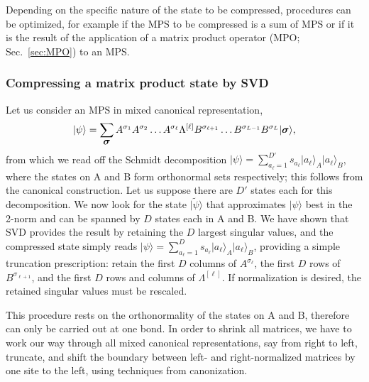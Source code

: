 \documentclass[a4paper,10pt,oneside,onecolumn,1p,times]{elsarticle}
\newcommand{\ket}[1]{\mbox{$| #1  \rangle$}}
\newcommand{\fat}[1]{\mbox{\boldmath$#1$\unboldmath}}	%
\begin{document}
Depending on the specific nature of the state to be compressed, procedures can be optimized, for example if the MPS to be compressed is a sum of MPS or if it is the result of the application of a matrix product operator (MPO; Sec.\ \ref{sec:MPO}) to an MPS.

\subsubsection{Compressing a matrix product state by SVD}
Let us consider an MPS in mixed canonical representation,
\begin{equation}
\ket{\psi} = \sum_{\fat{\sigma}} A^{\sigma_1} A^{\sigma_2} \ldots A^{\sigma_{\ell}} \Lambda^{[\ell]} B^{\sigma_{\ell+1}} \ldots B^{\sigma_{L-1}} B^{\sigma_L}  \ket{\fat{\sigma}} ,
\label{eq:compressionstart}
\end{equation}
from which we read off the Schmidt decomposition $\ket{\psi} = \sum_{a_\ell=1}^{D'} s_{a_\ell} \ket{a_\ell}_A \ket{a_\ell}_B$, where the states on A and B form orthonormal sets respectively; this follows from the canonical construction. Let us suppose there are $D'$ states each for this decomposition. We now look for the state $\ket{\tilde{\psi}}$ that approximates $\ket{\psi}$ best in the 2-norm and can be spanned by $D$ states each in A and B. We have shown that SVD provides the result by retaining the $D$ largest singular values, and the compressed state simply reads $\ket{\psi} = \sum_{a_\ell=1}^{D} s_{a_\ell} \ket{a_\ell}_A \ket{a_\ell}_B$, providing a simple truncation prescription: retain the first $D$ columns of $A^{\sigma_{\ell}}$, the first $D$ rows of  $B^{\sigma_{\ell+1}}$, and the first $D$ rows and columns of  $\Lambda^{[\ell]}$. If normalization is desired, the retained singular values must be rescaled.

This procedure rests on the orthonormality of the states on A and B, therefore can only be carried out at one bond. In order to shrink all matrices, we have to work our way through all mixed canonical representations, say from right to left, truncate, and shift the boundary between left- and right-normalized matrices by one site to the left, using techniques from canonization.
\end{document}
